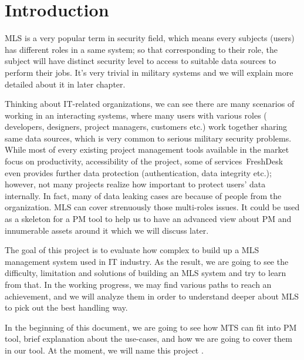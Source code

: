 ﻿%

\chapter{Introduction} %

\label{ch:introduction} %


MLS is a very popular term in security field, which means every subjects (\ie users) has different roles in a same system;
so that corresponding to their role, the subject will have distinct security level to access to suitable data sources to perform their jobs.
It's very trivial in military systems and we will explain more detailed about it in later chapter.

Thinking about IT-related organizations, we can see there are many scenarios of working in an interacting systems, where many users with various roles (\eg\,developers, designers, project managers, customers etc.) work together sharing same data sources, which is very common to serious military security problems.
While most of every existing project management tools available in the market focus on productivity, accessibility of the project, some of services \eg\,FreshDesk even provides further data protection (authentication, data integrity etc.);
however, not many projects realize how important to protect users' data internally. In fact, many of data leaking cases are because of people from the organization. MLS can cover strenuously those multi-roles issues. It could be used as a skeleton for a PM tool to help us to have an advanced view about PM and innumerable assets around it which we will discuss later.

The goal of this project is to evaluate how complex to build up a MLS management system used in IT industry.
As the result, we are going to see the difficulty, limitation and solutions of building an MLS system and try to learn from that.
In the working progress, we may find various paths to reach an achievement, and we will analyze them in order to understand deeper about MLS to pick out the best handling way.

In the beginning of this document, we are going to see how MTS can fit into PM tool, brief explanation about the use-cases, and how we are going to cover them in our tool.
At the moment, we will name this project \myProject.

